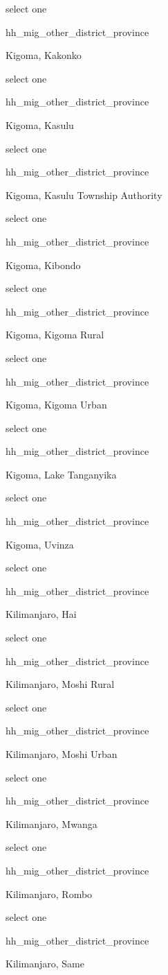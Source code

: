 \documentclass[]{article}
\begin{document}
select one

hh\_mig\_other\_district\_province

Kigoma, Kakonko

select one

hh\_mig\_other\_district\_province

Kigoma, Kasulu

select one

hh\_mig\_other\_district\_province

Kigoma, Kasulu Township Authority

select one

hh\_mig\_other\_district\_province

Kigoma, Kibondo

select one

hh\_mig\_other\_district\_province

Kigoma, Kigoma Rural

select one

hh\_mig\_other\_district\_province

Kigoma, Kigoma Urban

select one

hh\_mig\_other\_district\_province

Kigoma, Lake Tanganyika

select one

hh\_mig\_other\_district\_province

Kigoma, Uvinza

select one

hh\_mig\_other\_district\_province

Kilimanjaro, Hai

select one

hh\_mig\_other\_district\_province

Kilimanjaro, Moshi Rural

select one

hh\_mig\_other\_district\_province

Kilimanjaro, Moshi Urban

select one

hh\_mig\_other\_district\_province

Kilimanjaro, Mwanga

select one

hh\_mig\_other\_district\_province

Kilimanjaro, Rombo

select one

hh\_mig\_other\_district\_province

Kilimanjaro, Same
\end{document}
